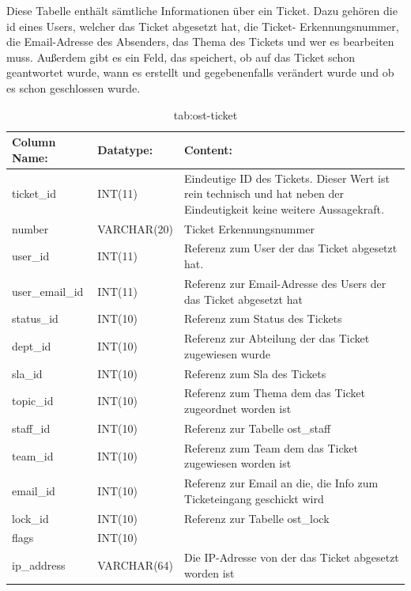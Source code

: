 Diese Tabelle enthält sämtliche Informationen über ein Ticket. Dazu gehören die id eines Users, welcher das Ticket abgesetzt hat, die Ticket- Erkennungsnummer, die Email-Adresse des Absenders, das Thema des Tickets und wer es bearbeiten muss. Außerdem gibt es ein Feld, das speichert, ob auf das Ticket schon geantwortet wurde, wann es erstellt und gegebenenfalls verändert wurde und ob es schon geschlossen wurde.


\begin{table}[h]
	\begin{tabular}{|p{3.5cm}|p{4cm}|p{6.2cm}|}
		\hline
		\textbf{Column Name:} & \textbf{Datatype:} & \textbf{Content:}\\
		\hline
		ticket\_id & INT(11) & Eindeutige ID des Tickets. Dieser Wert ist rein technisch und hat  neben der Eindeutigkeit keine weitere 
		Aussagekraft.\\
		\hline
		number & VARCHAR(20) & Ticket Erkennungsnummer \\
		\hline
		user\_id & INT(11) & Referenz zum User der das Ticket abgesetzt hat.\\
		\hline
		user\_email\_id & INT(11) & Referenz zur Email-Adresse des Users der das Ticket abgesetzt hat\\
		\hline
		status\_id & INT(10) & Referenz zum Status des Tickets\\
		\hline
		dept\_id & INT(10) &  Referenz zur Abteilung der das Ticket zugewiesen wurde\\
		\hline
		sla\_id & INT(10) & Referenz zum Sla des Tickets\\
		\hline
		topic\_id & INT(10) & Referenz zum Thema dem das Ticket zugeordnet worden ist\\
		\hline
		staff\_id & INT(10) & Referenz zur Tabelle ost\_staff \\
		\hline
		team\_id & INT(10) & Referenz zum Team dem das Ticket zugewiesen worden ist \\
		\hline
		email\_id & INT(10) & Referenz zur Email an die, die Info zum Ticketeingang geschickt wird \\
		\hline
		lock\_id & INT(10) & Referenz zur Tabelle ost\_lock \\
		\hline
		flags & INT(10) &  \\
		\hline
		ip\_address & VARCHAR(64) & Die IP-Adresse von der das Ticket abgesetzt worden ist \\
		\hline
			\end{tabular}
			\caption{tab:ost-ticket}
		\end{table}
